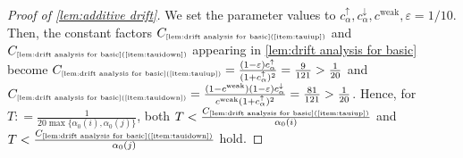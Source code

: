 \documentclass[letterpaper,11pt]{article}
\def\defeq{\mathrel{\mathop:}=}
\renewcommand{\epsilon}{\varepsilon}
\newcommand{\constref}[1]{C_{\mbox{\tiny\ref{#1}}}}
\newcommand{\constrefs}[2]{C_{\mbox{\tiny\ref{#1}(\ref{#2})}}}
\newcommand{\cweak}{c^{\mathrm{weak}}}
\newcommand{\calphaup}{c^{\uparrow}_\alpha}
\newcommand{\calphadown}{c^{\downarrow}_\alpha}
\newcommand{\tauiup}{\tau^{\uparrow}_i}
\newcommand{\ciup}{c_\alpha^{\uparrow}}
\newcommand{\tauidown}{\tau^{\downarrow}_i}
\newcommand{\taujup}{\tau^{\uparrow}_j}
\newcommand{\taujdown}{\tau^{\downarrow}_j}
\begin{document}
\begin{proof}[Proof of \cref{lem:additive drift}]
  We set the parameter values to $\calphaup,\calphadown,\cweak,\epsilon=1/10$.
  Then, the constant factors $\constrefs{lem:drift analysis for basic}{item:tauiup}$ and $\constrefs{lem:drift analysis for basic}{item:tauidown}$ appearing in \cref{lem:drift analysis for basic} become 
  $\constrefs{lem:drift analysis for basic}{item:tauiup}=\frac{ (1 - \varepsilon) \ciup }{(1+\ciup)^2}=\frac{9}{121}>\frac{1}{20}$ and 
  $\constrefs{lem:drift analysis for basic}{item:tauidown}=\frac{(1-\cweak)(1-\varepsilon)\calphadown}{\cweak (1+\ciup)^2}=\frac{81}{121}>\frac{1}{20}$.
  Hence, for $T\defeq \frac{1}{20\max\{\alpha_0(i),\alpha_0(j)\}}$, both $T<\frac{\constrefs{lem:drift analysis for basic}{item:tauiup}}{\alpha_0(i)}$ and $T<\frac{\constrefs{lem:drift analysis for basic}{item:tauidown}}{\alpha_0(j)}$ hold.
  

\end{proof}
\end{document}
